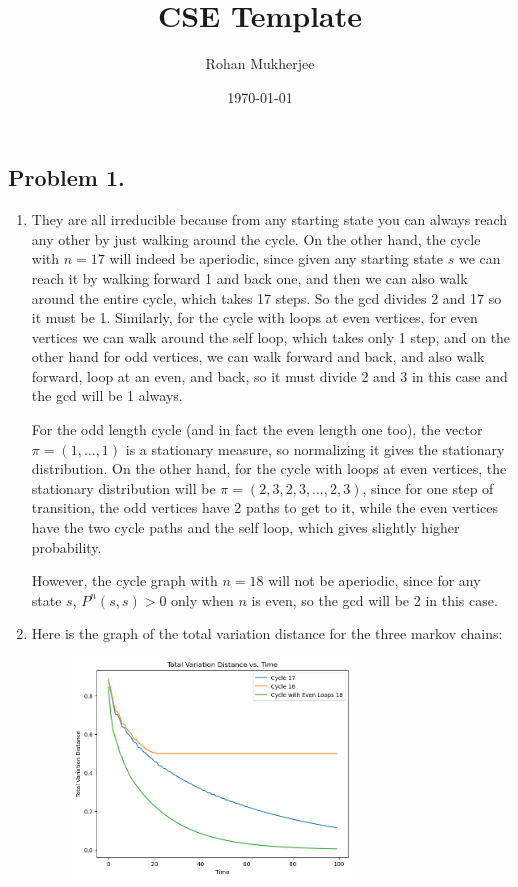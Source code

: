 \documentclass[12pt]{article}
\title{CSE Template}
\date{\today}
\author{Rohan Mukherjee}
\begin{document}
    \maketitle
    \subsection*{Problem 1.}
    \begin{enumerate}[label=(\alph*)]
        \item They are all irreducible because from any starting state you can always reach any other by just walking around the cycle. On the other hand, the cycle with $n=17$ will indeed be aperiodic, since given any starting state $s$ we can reach it by walking forward 1 and back one, and then we can also walk around the entire cycle, which takes 17 steps. So the gcd divides 2 and 17 so it must be 1. Similarly, for the cycle with loops at even vertices, for even vertices we can walk around the self loop, which takes only 1 step, and on the other hand for odd vertices, we can walk forward and back, and also walk forward, loop at an even, and back, so it must divide 2 and 3 in this case and the gcd will be 1 always.

        For the odd length cycle (and in fact the even length one too), the vector $\pi = (1,\ldots,1)$ is a stationary measure, so normalizing it gives the stationary distribution. On the other hand, for the cycle with loops at even vertices, the stationary distribution will be $\pi = (2, 3, 2, 3, \ldots, 2, 3)$, since for one step of transition, the odd vertices have 2 paths to get to it, while the even vertices have the two cycle paths and the self loop, which gives slightly higher probability.
        
        However, the cycle graph with $n=18$ will not be aperiodic, since for any state $s$, $P^n(s,s) > 0$ only when $n$ is even, so the gcd will be 2 in this case.

        \item Here is the graph of the total variation distance for the three markov chains:
        \begin{figure}[H]
            \centering
            \includegraphics[width=0.7\textwidth]{tv.png}
        \end{figure}


\end{enumerate}
\end{document}

